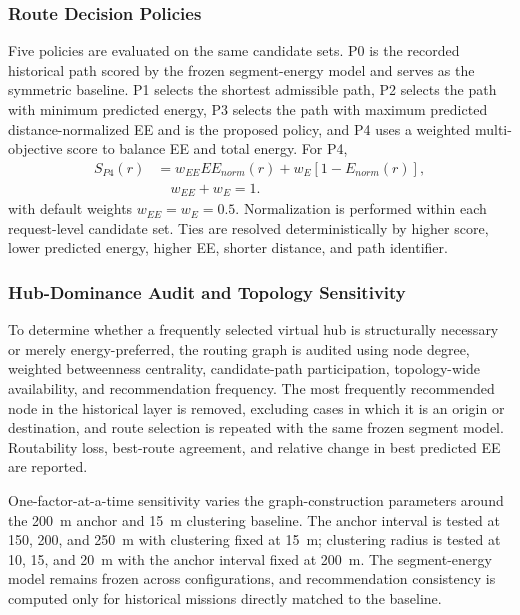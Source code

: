 \documentclass[conference,a4paper]{IEEEtran}
\begin{document}
\subsubsection{Route Decision Policies}
Five policies are evaluated on the same candidate sets. P0 is the recorded historical path scored by the frozen segment-energy model and serves as the symmetric baseline. P1 selects the shortest admissible path, P2 selects the path with minimum predicted energy, P3 selects the path with maximum predicted distance-normalized EE and is the proposed policy, and P4 uses a weighted multi-objective score to balance EE and total energy. For P4,
\begin{equation}
\begin{aligned}
S_{P4}(r) &= w_{EE}EE_{norm}(r)+w_E[1-E_{norm}(r)],\\
&\quad w_{EE}+w_E=1.
\end{aligned}
\end{equation}
with default weights $w_{EE}=w_E=0.5$. Normalization is performed within each request-level candidate set. Ties are resolved deterministically by higher score, lower predicted energy, higher EE, shorter distance, and path identifier.

\subsubsection{Hub-Dominance Audit and Topology Sensitivity}
To determine whether a frequently selected virtual hub is structurally necessary or merely energy-preferred, the routing graph is audited using node degree, weighted betweenness centrality, candidate-path participation, topology-wide availability, and recommendation frequency. The most frequently recommended node in the historical layer is removed, excluding cases in which it is an origin or destination, and route selection is repeated with the same frozen segment model. Routability loss, best-route agreement, and relative change in best predicted EE are reported.

One-factor-at-a-time sensitivity varies the graph-construction parameters around the 200~m anchor and 15~m clustering baseline. The anchor interval is tested at 150, 200, and 250~m with clustering fixed at 15~m; clustering radius is tested at 10, 15, and 20~m with the anchor interval fixed at 200~m. The segment-energy model remains frozen across configurations, and recommendation consistency is computed only for historical missions directly matched to the baseline.
\end{document}
